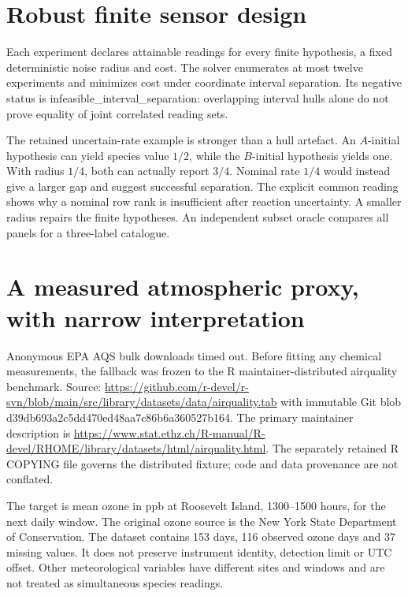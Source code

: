 \documentclass[
  11pt,
  a4paper,
]{report}
\begin{document}
\hypertarget{robust-finite-sensor-design}{%
\section{Robust finite sensor
design}\label{robust-finite-sensor-design}}

Each experiment declares attainable readings for every finite
hypothesis, a fixed deterministic noise radius and cost. The solver
enumerates at most twelve experiments and minimizes cost under
coordinate interval separation. Its negative status is
infeasible\_interval\_separation: overlapping interval hulls alone do
not prove equality of joint correlated reading sets.

The retained uncertain-rate example is stronger than a hull artefact. An
\(A\)-initial hypothesis can yield species value \(1/2\), while the
\(B\)-initial hypothesis yields one. With radius \(1/4\), both can
actually report \(3/4\). Nominal rate \(1/4\) would instead give a
larger gap and suggest successful separation. The explicit common
reading shows why a nominal row rank is insufficient after reaction
uncertainty. A smaller radius repairs the finite hypotheses. An
independent subset oracle compares all panels for a three-label
catalogue.

\hypertarget{a-measured-atmospheric-proxy-with-narrow-interpretation}{%
\section{A measured atmospheric proxy, with narrow
interpretation}\label{a-measured-atmospheric-proxy-with-narrow-interpretation}}

Anonymous EPA AQS bulk downloads timed out. Before fitting any chemical
measurements, the fallback was frozen to the R maintainer-distributed
airquality benchmark. Source:
\url{https://github.com/r-devel/r-svn/blob/main/src/library/datasets/data/airquality.tab}
with immutable Git blob d39db693a2c5dd470ed48aa7c86b6a360527b164. The
primary maintainer description is
\url{https://www.stat.ethz.ch/R-manual/R-devel/RHOME/library/datasets/html/airquality.html}.
The separately retained R COPYING file governs the distributed fixture;
code and data provenance are not conflated.

The target is mean ozone in ppb at Roosevelt Island, 1300--1500 hours,
for the next daily window. The original ozone source is the New York
State Department of Conservation. The dataset contains 153 days, 116
observed ozone days and 37 missing values. It does not preserve
instrument identity, detection limit or UTC offset. Other meteorological
variables have different sites and windows and are not treated as
simultaneous species readings.
\end{document}

